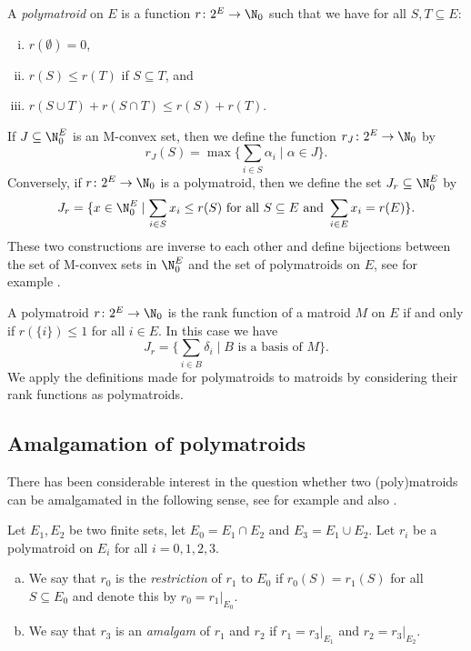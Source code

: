 \begin{Def}
    A \emph{polymatroid} on $E$ is a function $r\colon 2^E\to\N_0$ such that we have for all $S,T\subseteq E$:
            \begin{enumerate}[(i)]
            \item $r(\emptyset)=0$,
                \item $r(S)\leq r(T)$ if $S\subseteq T$, and
                \item $r(S\cup T)+r(S\cap T)\leq r(S)+r(T)$.
            \end{enumerate}
\end{Def}
If $J\subseteq\N_0^E$ is an M-convex set, then we define the function $r_J\colon2^E\to\N_0$ by
    \begin{equation*}
        r_J(S)=\max\{\sum_{i\in S}\alpha_i\mid \alpha\in J\}.
    \end{equation*}
Conversely, if $r\colon 2^E\to\N_0$ is a polymatroid, then we define the set $J_r\subseteq\N_0^E$ by
\begin{equation*}
    J_r=\{x\in\N_0^E\mid \sum_{i\in S}x_i\leq r(S)\textrm{ for all }S\subseteq E\textrm{ and }\sum_{i\in E}x_i=r(E)\}.
\end{equation*}
These two constructions are inverse to each other and define bijections between the set of M-convex sets in $\N_0^E$ and the set of polymatroids on $E$, see for example \cite[\S4.4]{murota}.

\begin{rem}
    A polymatroid $r\colon 2^E\to\N_0$ is the rank function of a matroid $M$ on $E$ if and only if $r(\{i\})\leq1$ for all $i\in E$. In this case we have
    \begin{equation*}
        J_r=\{\sum_{i\in B}\delta_i\mid B\textrm{ is a basis of }M\}.
    \end{equation*}
    We apply the definitions made for polymatroids to matroids by considering their rank functions as polymatroids.
\end{rem}

\subsection{Amalgamation of polymatroids}
There has been considerable interest in the question whether two (poly)matroids can be amalgamated in the following sense, see for example \cite{sticky,stickypolymatroids} and also \cite[\S11.4]{oxley}.
\begin{Def}\label{def:amal}
    Let $E_1,E_2$ be two finite sets, let $E_0=E_1\cap E_2$ and $E_3=E_1\cup E_2$. Let $r_i$ be a polymatroid on $E_i$ for all $i=0,1,2,3$.
    \begin{enumerate}[(a)]
        \item We say that $r_0$ is the \emph{restriction} of $r_1$ to $E_0$ if $r_0(S)=r_1(S)$ for all $S\subseteq E_0$ and denote this by $r_0=r_1|_{E_0}$.
        \item We say that $r_3$ is an \emph{amalgam} of $r_1$ and $r_2$ if $r_1=r_3|_{E_1}$ and $r_2=r_3|_{E_2}$.
    \end{enumerate}
\end{Def}

